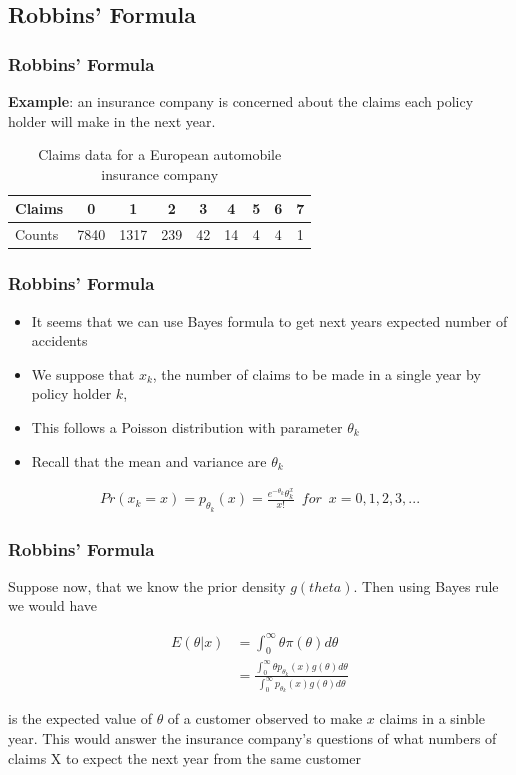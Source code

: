\documentclass[
  shownotes,
  xcolor={svgnames},
  hyperref={colorlinks,citecolor=DarkBlue,linkcolor=DarkRed,urlcolor=DarkBlue}
  ]{beamer}
\begin{document}
\subsection{Robbins' Formula}
\begin{frame}[fragile]
\frametitle{Robbins' Formula}
{\bf Example}: an insurance company is concerned about the claims each policy holder will make in the next year.
\begin{table}[H]
\caption{Claims data for a European automobile insurance company}
\begin{tabular}{lcccccccc}
Claims & 0    & 1    & 2   & 3  & 4  & 5 & 6 & 7 \\
\hline
Counts & 7840 & 1317 & 239 & 42 & 14 & 4 & 4 & 1 \\
\end{tabular}
\end{table}

\end{frame}
\begin{frame}[fragile]
\frametitle{Robbins' Formula}

\begin{itemize}
\item It seems that we can use Bayes formula to get next years expected number of accidents
\item We suppose that $x_k$, the number of claims to be made in a single year by policy holder $k$, 
\item This follows a Poisson distribution with parameter $\theta_k$
\item Recall that the mean and variance are $\theta_k$
\end{itemize}

\begin{align}
Pr(x_k=x) = p_{\theta_k}(x)= \frac{e^{-\theta_k} \theta_k^x}{x!} \,\,\, for \,\,\, x=0,1,2,3,...
\end{align}


\end{frame}
\begin{frame}[fragile]
\frametitle{Robbins' Formula}

Suppose now, that we know the prior density $g(theta)$. Then using Bayes rule we would have

\begin{align}
E(\theta|x)&= \int_0^{\infty} \theta \pi(\theta)d\theta \\
 &=\frac{\int_0^{\infty} \theta p_{\theta_k}(x) g(\theta) d\theta }{\int_0^{\infty} p_{\theta_k}(x) g(\theta) d\theta}
\end{align}

is the expected value of $\theta$ of a customer observed to make $x$ claims in a sinble year. This would answer the insurance company's questions of what numbers of claims X to expect the next year from the same customer

\end{frame}
\end{document}
